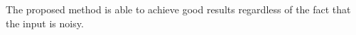 The proposed method is able to achieve good results regardless of the fact that the input is noisy.
